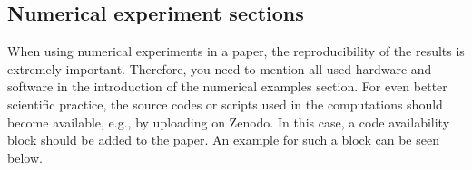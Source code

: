 \documentclass[%
  a4paper,
  twocolumn,
  algotwoe,
]{preprint}
\begin{document}
%  
%    
%  
%      
%        


\subsection{Numerical experiment sections}%
\label{subsec:numexp}

When using numerical experiments in a paper, the reproducibility of the
results is extremely important.
Therefore, you need to mention all used hardware and software in the
introduction of the numerical examples section.
For even better scientific practice, the source codes or scripts used in the
computations should become available, e.g., by uploading on Zenodo.
In this case, a code availability block should be added to the paper.
An example for such a block can be seen below.

\begin{center}%
  \setlength{\fboxsep}{5pt}%
\end{center}
\end{document}
